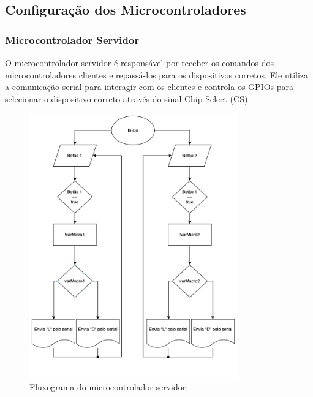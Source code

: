 \documentclass[12pt, a4paper]{article}
\begin{document}
\subsection{Configuração dos Microcontroladores}
\subsubsection{Microcontrolador Servidor}
O microcontrolador servidor é responsável por receber os comandos dos microcontroladores clientes e repassá-los para os dispositivos corretos. Ele utiliza a comunicação serial para interagir com os clientes e controla os GPIOs para selecionar o dispositivo correto através do sinal Chip Select (CS).
\begin{figure}[H]
	\centering
	\includegraphics[width=0.8\textwidth]{fluxograma_servidor.png}
	\caption{Fluxograma do microcontrolador servidor.}
	\label{fig:fluxograma_servidor}
\end{figure}
\end{document}
